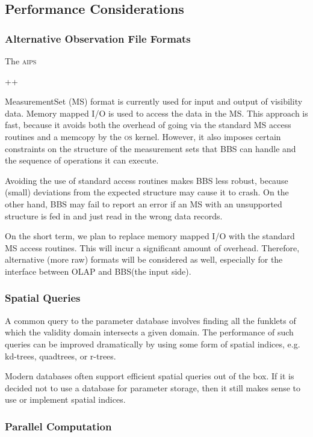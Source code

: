 \documentclass[10pt]{lofar}
\newcommand{\aips}{\textsc{aips}\begin{footnotesize}++\end{footnotesize}\xspace}
\newcommand{\bbs}{BBS\xspace}
\newcommand{\ms}{MS\xspace}
\newcommand{\olap}{OLAP\xspace}
\begin{document}
\subsection{Performance Considerations}
\label{subsec:performance-considerations}

\subsubsection{Alternative Observation File Formats}
\label{subsubsec:performance-file-formats}

The \aips MeasurementSet (\ms) format \cite{aips++note229} is currently used for
input and output of visibility data. Memory mapped I/O is used to access the
data in the \ms. This approach is fast, because it avoids both the overhead of
going via the standard \ms access routines and a memcopy by the \textsc{os}
kernel. However, it also imposes certain constraints on the structure of the
measurement sets that \bbs can handle and the sequence of operations it can
execute.

Avoiding the use of standard access routines makes \bbs less robust, because
(small) deviations from the expected structure may cause it to crash. On the
other hand, \bbs may fail to report an error if an \ms with an unsupported
structure is fed in and just read in the wrong data records.

On the short term, we plan to replace memory mapped I/O with the standard \ms
access routines. This will incur a significant amount of overhead. Therefore,
alternative (more raw) formats will be considered as well, especially for the
interface between \olap and \bbs (the input side).

\subsubsection{Spatial Queries}
\label{subsubsec:performance-spatial-queries}

A common query to the parameter database involves finding all the funklets of
which the validity domain intersects a given domain. The performance of such
queries can be improved dramatically by using some form of spatial indices, e.g.
kd-trees, quadtrees, or r-trees.

Modern databases often support efficient spatial queries out of the box. If it
is decided not to use a database for parameter storage, then it still makes
sense to use or implement spatial indices. 

\subsubsection{Parallel Computation}
\label{subsubsec:performance-parallel-computation}
\end{document}
